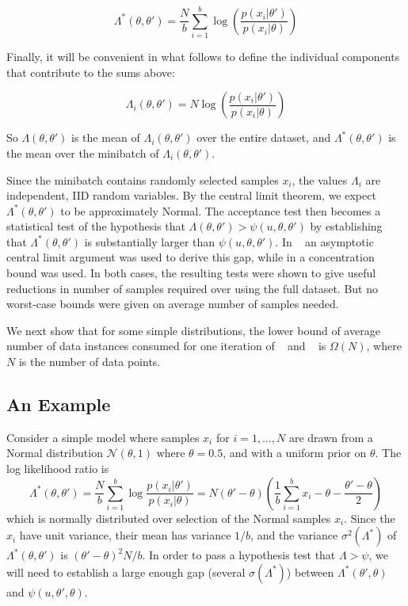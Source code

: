 \documentclass{article}
\begin{document}
\begin{equation}
\Lambda^*(\theta,\theta') = \frac{N}{b}\sum_{i=1}^b \log\left(\frac{p(x_i|\theta')}{p(x_i|\theta)}\right)  
\end{equation}

Finally, it will be convenient in what follows to define the individual components that
contribute to the sums above:

\begin{equation}\label{eq:individual_terms}
\Lambda_i(\theta,\theta') = N \log\left(\frac{p(x_i|\theta')}{p(x_i|\theta)}\right)  
\end{equation}

So $\Lambda(\theta,\theta')$ is the mean of $\Lambda_i(\theta,\theta')$ over the
entire dataset, and $\Lambda^*(\theta,\theta')$ is the mean over the minibatch
of $\Lambda_i(\theta,\theta')$. 

Since the minibatch contains randomly selected samples $x_i$, the
values $\Lambda_i$ are independent, IID random variables.  By the central
limit theorem, we expect $\Lambda^*(\theta,\theta')$ to be
approximately Normal.  The acceptance test then becomes a statistical
test of the hypothesis that $\Lambda(\theta,\theta') >
\psi(u,\theta,\theta')$ by establishing that
$\Lambda^*(\theta,\theta')$ is substantially larger than
$\psi(u,\theta,\theta')$.  In ~\cite{cutting_mh_2014} an asymptotic
central limit argument was used to derive this gap, while in
\cite{icml2014c1_bardenet14} a concentration bound was used. In both
cases, the resulting tests were shown to give useful reductions in
number of samples required over using the full dataset. But no
worst-case bounds were given on average number of samples needed.

We next show that for some simple distributions, the lower
bound of average number of data instances consumed for one iteration of
~\cite{cutting_mh_2014} and ~\cite{icml2014c1_bardenet14} is
$\Omega(N)$, where $N$ is the number of data points.

\subsection{An Example}
Consider a simple model where samples $x_i$ for $i=1,\ldots,N$ are
drawn from a Normal distribution $\mathcal{N}(\theta,1)$ where
$\theta=0.5$, and with a uniform prior on $\theta$. The log likelihood ratio is
\begin{equation}
\Lambda^*(\theta,\theta') =  \frac{N}{b}\sum_{i=1}^b \log\frac{p(x_i|\theta')}{p(x_i|\theta)}=
  N(\theta'-\theta)\left(\frac{1}{b}\sum_{i=1}^b x_i-\theta-\frac{\theta'-\theta}{2}\right)
\end{equation}
which is normally distributed over selection of the Normal samples $x_i$.
Since the $x_i$ have unit variance, their mean has variance $1/b$, and the variance $\sigma^2(\Lambda^*)$
of $\Lambda^*(\theta,\theta')$ is $(\theta'-\theta)^2N/b$. In order to pass
a hypothesis test that $\Lambda > \psi$, we will need to establish a
large enough gap (several $\sigma(\Lambda^*)$) between $\Lambda^*(\theta',\theta)$
and $\psi(u,\theta',\theta)$.
\end{document}
